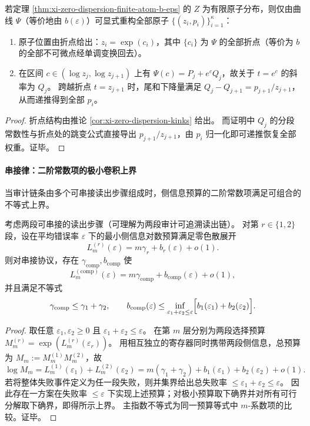 \begin{corollary}\label{cor:xi-zero-dispersion-finite-atom-reconstruction}
若定理 \ref{thm:xi-zero-dispersion-finite-atom-b-eps} 的 \(Z\) 为有限原子分布，则仅由曲线 \(\Psi\)（等价地由 \(b(\varepsilon)\)）可显式重构全部原子 \(\{(z_i,p_i)\}_{i=1}^{\kappa}\)：
\begin{enumerate}
  \item 原子位置由折点给出：\(z_i=\exp(c_i)\)，其中 \(\{c_i\}\) 为 \(\Psi\) 的全部折点（等价为 \(b\) 的全部不可微点经单调变换回去）。
  \item 在区间 \(c\in(\log z_j,\log z_{j+1})\) 上有 \(\Psi(c)=P_j+e^cQ_j\)，故关于 \(t=e^c\) 的斜率为 \(Q_j\)。
        跨越折点 \(t=z_{j+1}\) 时，尾和下降量满足 \(Q_j-Q_{j+1}=p_{j+1}/z_{j+1}\)，从而递推得到全部 \(p_i\)。
\end{enumerate}
\end{corollary}
\begin{proof}
折点结构由推论 \ref{cor:xi-zero-dispersion-kinks} 给出。
而证明中 \(Q_j\) 的分段常数性与折点处的跳变公式直接导出 \(p_{j+1}/z_{j+1}\)，由 \(p_i\) 归一化即可递推恢复全部权重。证毕。
\end{proof}

\paragraph{串接律：二阶常数项的极小卷积上界}
当审计链条由多个可串接读出步骤组成时，侧信息预算的二阶常数项满足可组合的不等式上界。

\begin{theorem}\label{thm:xi-zero-dispersion-infimal-convolution}
考虑两段可串接的读出步骤（可理解为两段审计可追溯读出链）。
对第 \(r\in\{1,2\}\) 段，设在平均错误率 \(\varepsilon\) 下的最小侧信息对数预算满足零色散展开
\[
L^{(r)}_m(\varepsilon)=m\gamma_r+b_r(\varepsilon)+o(1).
\]
则对串接协议，存在 \(\gamma_{\mathrm{comp}},b_{\mathrm{comp}}\) 使
\[
L^{(\mathrm{comp})}_m(\varepsilon)=m\gamma_{\mathrm{comp}}+b_{\mathrm{comp}}(\varepsilon)+o(1),
\]
并且满足不等式
\[
\gamma_{\mathrm{comp}}\le \gamma_1+\gamma_2,
\qquad
b_{\mathrm{comp}}(\varepsilon)\le
\inf_{\varepsilon_1+\varepsilon_2\le \varepsilon}\Bigl[b_1(\varepsilon_1)+b_2(\varepsilon_2)\Bigr].
\]
\end{theorem}
\begin{proof}
取任意 \(\varepsilon_1,\varepsilon_2\ge 0\) 且 \(\varepsilon_1+\varepsilon_2\le\varepsilon\)。
在第 \(m\) 层分别为两段选择预算
\(
M^{(r)}_m=\exp(L^{(r)}_m(\varepsilon_r))
\)。
用相互独立的寄存器同时携带两段侧信息，总预算为 \(M_m:=M^{(1)}_mM^{(2)}_m\)，故
\[
\log M_m=L^{(1)}_m(\varepsilon_1)+L^{(2)}_m(\varepsilon_2)
=m(\gamma_1+\gamma_2)+b_1(\varepsilon_1)+b_2(\varepsilon_2)+o(1).
\]
若将整体失败事件定义为任一段失败，则并集界给出总失败率 \(\le\varepsilon_1+\varepsilon_2\le\varepsilon\)。
因此存在一方案在失败率 \(\le\varepsilon\) 下实现上述预算；对极小预算取下确界并对所有可行分解取下确界，即得所示上界。
主指数不等式为同一预算等式中 \(m\)-系数项的比较。证毕。
\end{proof}

